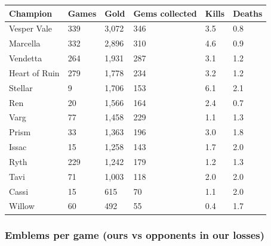 \documentclass[
  10pt,
]{article}
\newcounter{none} %
\begin{document}
{\def\LTcaptype{none} %
\begin{longtable}[]{@{}llllll@{}}
\toprule\noalign{}
Champion & Games & Gold & Gems collected & Kills & Deaths \\
\midrule\noalign{}
\endhead
\bottomrule\noalign{}
\endlastfoot
Vesper Vale & 339 & 3,072 & 346 & 3.5 & 0.8 \\
Marcella & 332 & 2,896 & 310 & 4.6 & 0.9 \\
Vendetta & 264 & 1,931 & 287 & 3.1 & 1.2 \\
Heart of Ruin & 279 & 1,778 & 234 & 3.2 & 1.2 \\
Stellar & 9 & 1,706 & 153 & 6.1 & 2.1 \\
Ren & 20 & 1,566 & 164 & 2.4 & 0.7 \\
Varg & 77 & 1,458 & 229 & 1.1 & 1.3 \\
Prism & 33 & 1,363 & 196 & 3.0 & 1.8 \\
Issac & 15 & 1,258 & 143 & 1.7 & 2.0 \\
Ryth & 229 & 1,242 & 179 & 1.2 & 1.3 \\
Tavi & 71 & 1,003 & 118 & 2.0 & 2.0 \\
Cassi & 15 & 615 & 70 & 1.1 & 2.0 \\
Willow & 60 & 492 & 55 & 0.4 & 1.7 \\
\end{longtable}
}

\subsubsection{Emblems per game (ours vs opponents in our
losses)}\label{emblems-per-game-ours-vs-opponents-in-our-losses}
\end{document}
